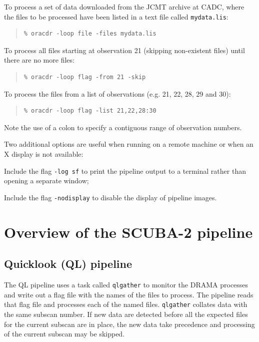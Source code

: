 \documentclass[twoside,11pt]{article}
\newcommand{\xlabel}[1]{}
\renewcommand{\_}{\texttt{\symbol{95}}}
\newenvironment{myquote}{\begin{quote}\begin{small}}{\end{small}\end{quote}}
\begin{document}
To process a set of data downloaded from the JCMT archive at CADC,
where the files to be processed have been listed in a text file called
\verb+mydata.lis+:
\begin{myquote}
\begin{verbatim}
% oracdr -loop file -files mydata.lis
\end{verbatim}
\end{myquote}

To process all files starting at observation 21 (skipping non-existent
files) until there are no more files:
\begin{myquote}
\begin{verbatim}
% oracdr -loop flag -from 21 -skip
\end{verbatim}
\end{myquote}

To process the files from a list of observations (e.g. 21, 22, 28, 29 and
30):
\begin{myquote}
\begin{verbatim}
% oracdr -loop flag -list 21,22,28:30
\end{verbatim}
\end{myquote}
Note the use of a colon to specify a contiguous range of observation
numbers.

Two additional options are useful when running on a remote machine or
when an X display is not available:
\begin{trivlist}
\item Include the flag \verb+-log sf+ to print the pipeline output to
  a terminal rather than opening a separate window;
\item Include the flag \verb+-nodisplay+ to disable the display of
  pipeline images.
\end{trivlist}

\section{\xlabel{overview}Overview of the SCUBA-2 pipeline\label{se:overview}}

\subsection{Quicklook (QL) pipeline}

The QL pipeline uses a task called \verb+qlgather+ to monitor the
DRAMA processes and write out a flag file with the names of the files
to process. The pipeline reads that flag file and processes each of
the named files. \verb+qlgather+ collates data with the same subscan
number. If new data are detected before all the expected files for
the current subscan are in place, the new data take precedence and
processing of the current subscan may be skipped.
\end{document}
